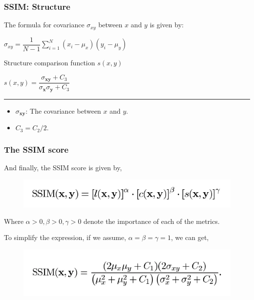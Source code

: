 \documentclass[13.5pt,aspecratio=169, xcolor=dvipsnames]{beamer}
\begin{document}
\begin{frame}
    \onehalfspacing
        \frametitle{SSIM: Structure}
        
        The formula for covariance {\Large $\sigma_{xy}$} between $x$ and $y$ is given by:
        \smallskip
        {\Large
        \begin{center}
            $ \sigma_{xy} = \dfrac{1}{N-1} \sum_{i=1}^{N} (x_i - \mu_x)(y_i - \mu_y)
              $
        \end{center}
        }

        \begin{block}{Structure comparison function $s(x,y)$}
            {\Large
            \begin{center}
                $ s(x,y) = \dfrac{\sigma_{\textbf{xy}} + C_3}{\sigma_{\textbf{x}} \sigma_{\textbf{y}} + C_3} $
            \end{center}
            }
            \hspace{8em}\rule{0.5\textwidth}{0.4pt}
            \begin{itemize}
                \item {\Large $\sigma_{\textbf{xy}}$}: The covariance between $x$ and $y$.
                \item $C_3 = C_2 / 2$.
            \end{itemize}
        \end{block}
        
        
      
\end{frame}
    

\begin{frame}
    \onehalfspacing
        \frametitle{The SSIM score}
        
        And finally, the SSIM score is given by,
        \begin{figure}
            \centering
            \includegraphics[width=0.8\linewidth]{SSIM_Formula.png}
        \end{figure}
            \begin{block}{}
                Where $\alpha > 0, \beta > 0, \gamma > 0$ denote the importance of each of the metrics. 
            \end{block}

        To simplify the expression, if we assume, $\alpha = \beta = \gamma = 1$, we can get,
        \begin{figure}
            \centering
            \includegraphics[width=0.8\linewidth]{SSIM_Formula_Simp.png}
        \end{figure}
        
\end{frame}
    
\end{document}
